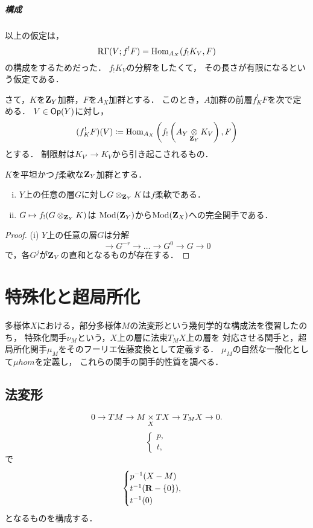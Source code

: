 \paragraph{構成}
以上の仮定は，
\[
    \RG(V;f^!{F})
    =\Hom_{A_X}({f_!}K_V,F)
\]
の構成をするためだった．
\(f_!K_V\)の分解をしたくて，
その長さが有限になるという仮定である．

さて，\(K\)を\(\zz_Y\)加群，\(F\)を\(A_X\)加群とする．
このとき，\(A\)加群の前層\(f^!_KF\)を次で定める．
\(V\in\Op(Y)\)に対し，
\[
    (f^!_KF)(V)
    \coloneqq
    \Hom_{A_X}\left(f_!\left(
        A_Y\mathop{\otimes}\limits_{\zz_Y}K_V
    \right),F\right)
\]
とする．
制限射は\(K_{V'}\to{K_V}\)から引き起こされるもの．

\begin{LMM}
    \(K\)を平坦かつ\(f\)柔軟な\(\zz_Y\)加群とする．
    \begin{enumerate}[(i)]
        \item \(Y\)上の任意の層\(G\)に対し\(G\otimes_{\zz_Y}K\)は\(f\)柔軟である．
        \item \(G\mapsto f_!(G\otimes_{\zz_Y}K)\)は
        \(\Mod(\zz_Y)\)から\(\Mod(\zz_X)\)への完全関手である．
    \end{enumerate}
\end{LMM}
\begin{proof}
    (i) 
    \(Y\)上の任意の層\(G\)は分解
    \[
        \to{G^{-r}}\to\dots\to{G^{0}}\to{G}\to0
    \]
    で，各\(G^{j}\)が\(\zz_V\)の直和となるものが存在する．
\end{proof}




\chapter{特殊化と超局所化}\label{chap4}
多様体\(X\)における，部分多様体\(M\)の法変形という幾何学的な構成法を復習したのち，
特殊化関手\(\nu_M\)という，\(X\)上の層に法束\(T_MX\)上の層を
対応させる関手と，超局所化関手\(\mu_M\)をそのフーリエ佐藤変換として定義する．
\(\mu_M\)の自然な一般化として\(\mu hom\)を定義し，
これらの関手の関手的性質を調べる．

\section{法変形}\label{sec41}
\begin{equation}
    0\to TM\to M\pb[X]TX\to T_{M}X\to0.
\end{equation}
\begin{equation}
    \begin{cases}
        p,\\
        t,
    \end{cases}
\end{equation}
で
\begin{equation}
    \begin{cases}
        p^{-1}(X-M)\\
        t^{-1}(\rr-\{0\}),\\
        t^{-1}(0)
    \end{cases}
\end{equation}
となるものを構成する．


